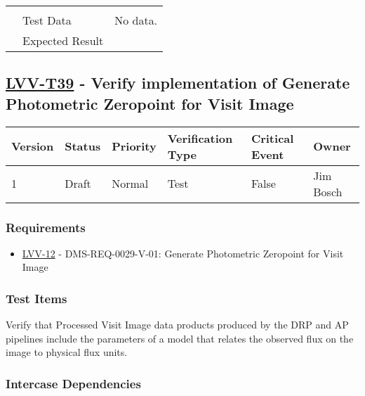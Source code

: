 \begin{longtable}[]{p{1.3cm}p{2cm}p{13cm}}
\begin{minipage}[t]{13cm}
{            \vspace{\dp0}
            } \end{minipage} \\ \cline{2-3}
            & Test Data &
            \begin{minipage}[t]{13cm}{\footnotesize
                No data.
                \vspace{\dp0}
            } \end{minipage} \\ \cline{2-3}
            & Expected Result &
        \\ \midrule
    \end{longtable}

\subsection{\href{https://jira.lsstcorp.org/secure/Tests.jspa\#/testCase/LVV-T39}{LVV-T39}
    - Verify implementation of Generate Photometric Zeropoint for Visit Image}\label{lvv-t39}

\begin{longtable}[]{llllll}
\toprule
Version & Status & Priority & Verification Type & Critical Event & Owner
\\\midrule
1 & Draft & Normal &
Test & False & Jim Bosch
\\\bottomrule
\end{longtable}

\subsubsection{Requirements}
\begin{itemize}
\item \href{https://jira.lsstcorp.org/browse/LVV-12}{LVV-12} - DMS-REQ-0029-V-01: Generate Photometric Zeropoint for Visit Image
\end{itemize}

\subsubsection{Test Items}
Verify that Processed Visit Image data products produced by the DRP and
AP pipelines include the parameters of a model that relates the observed
flux on the image to physical flux units.



\subsubsection{Intercase Dependencies}

